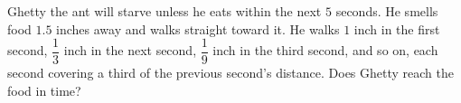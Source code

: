 Ghetty the ant will starve unless he eats within the next $5$ seconds. He smells food $1.5$ inches away and walks straight toward it. He walks $1$ inch in the first second, $\dfrac13$ inch in the next second, $\dfrac19$ inch in the third second, and so on, each second covering a third of the previous second's distance. Does Ghetty reach the food in time?
